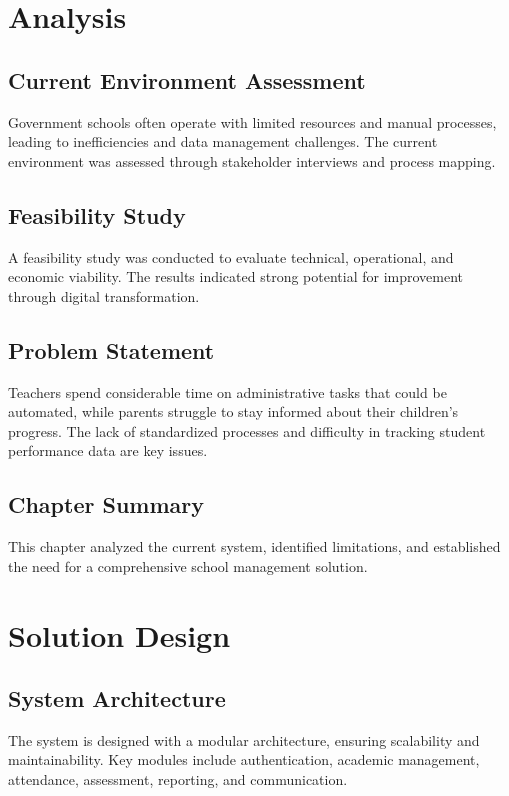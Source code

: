 \documentclass[12pt,a4paper]{report}
\begin{document}
\chapter{Analysis}
\section{Current Environment Assessment}
Government schools often operate with limited resources and manual processes, leading to inefficiencies and data management challenges. The current environment was assessed through stakeholder interviews and process mapping.

\section{Feasibility Study}
A feasibility study was conducted to evaluate technical, operational, and economic viability. The results indicated strong potential for improvement through digital transformation.

\section{Problem Statement}
Teachers spend considerable time on administrative tasks that could be automated, while parents struggle to stay informed about their children's progress. The lack of standardized processes and difficulty in tracking student performance data are key issues.

\section{Chapter Summary}
This chapter analyzed the current system, identified limitations, and established the need for a comprehensive school management solution.

\chapter{Solution Design}
\section{System Architecture}
The system is designed with a modular architecture, ensuring scalability and maintainability. Key modules include authentication, academic management, attendance, assessment, reporting, and communication.
\end{document}
